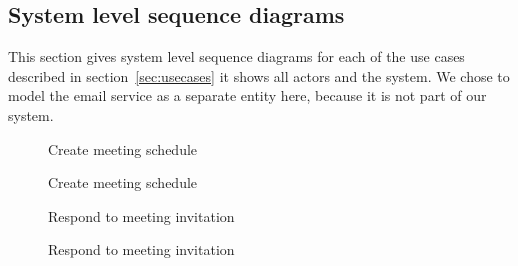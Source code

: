 \subsection{System level sequence diagrams}
	This section gives system level sequence diagrams for each of the use cases described in section~\ref{sec:usecases} it shows all actors and the system. We chose to model the email service as a separate entity here, because it is not part of our system.
	\begin{figure}[H]
		\centering
		\begin{msc}{Create meeting schedule}

			\nextlevel

			\nextlevel

			\nextlevel
			\nextlevel

			\nextlevel
			\nextlevel

			\nextlevel

			\nextlevel

			\nextlevel
			\nextlevel

			\nextlevel
			
			\nextlevel
			\nextlevel

			\nextlevel
			
			\nextlevel
			\nextlevel

			\nextlevel

		\end{msc}
		\caption{Create meeting schedule}
		\label{smsc:createmeeting}
	\end{figure}

	\begin{figure}[H]
		\centering
		\begin{msc}{Respond to meeting invitation}

			\nextlevel

			\nextlevel
			\nextlevel

			\nextlevel
			\nextlevel

			\nextlevel

			\nextlevel
			\nextlevel

			\nextlevel
		\end{msc}
		\caption{Respond to meeting invitation}
		\label{smsc:respondmeeting}
	\end{figure}

